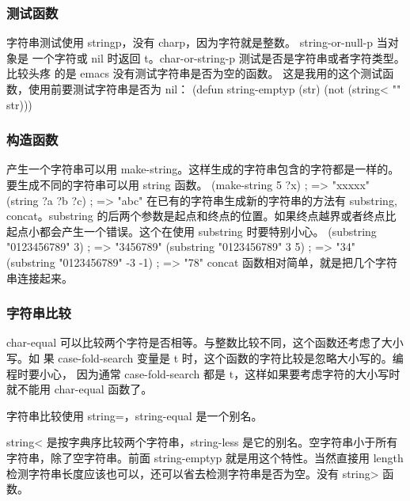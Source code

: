 \documentclass[11pt]{ctexart}
\begin{document}
\subsubsection{测试函数}
\label{sec:orgaac448b}
字符串测试使用 stringp，没有 charp，因为字符就是整数。 string-or-null-p 当对象是
一个字符或 nil 时返回 t。char-or-string-p 测试是否是字符串或者字符类型。比较头疼
的是 emacs 没有测试字符串是否为空的函数。
这是我用的这个测试函数，使用前要测试字符串是否为 nil：
(defun string-emptyp (str)
(not (string< "" str)))
\subsubsection{构造函数}
\label{sec:orgfbe0d51}
产生一个字符串可以用 make-string。这样生成的字符串包含的字符都是一样的。要生成不同的字符串可以用 string 函数。
(make-string 5 ?x)                      ; => "xxxxx"
(string ?a ?b ?c)                       ; => "abc"
在已有的字符串生成新的字符串的方法有 substring, concat。substring 的后两个参数是起点和终点的位置。如果终点越界或者终点比起点小都会产生一个错误。这个在使用 substring 时要特别小心。
(substring "0123456789" 3)              ; => "3456789"
(substring "0123456789" 3 5)            ; => "34"
(substring "0123456789" -3 -1)          ; => "78"
concat 函数相对简单，就是把几个字符串连接起来。
\subsubsection{字符串比较}
\label{sec:orgae25169}
char-equal 可以比较两个字符是否相等。与整数比较不同，这个函数还考虑了大小写。如
果 case-fold-search 变量是 t 时，这个函数的字符比较是忽略大小写的。编程时要小心，
因为通常 case-fold-search 都是 t，这样如果要考虑字符的大小写时就不能用
char-equal 函数了。

字符串比较使用 string=，string-equal 是一个别名。

string< 是按字典序比较两个字符串，string-less 是它的别名。空字符串小于所有字符串，除了空字符串。前面 string-emptyp 就是用这个特性。当然直接用 length 检测字符串长度应该也可以，还可以省去检测字符串是否为空。没有 string> 函数。
\end{document}
